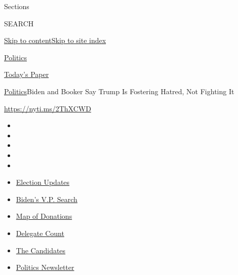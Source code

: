 Sections

SEARCH

\protect\hyperlink{site-content}{Skip to
content}\protect\hyperlink{site-index}{Skip to site index}

\href{https://www.nytimes.com/section/politics}{Politics}

\href{https://myaccount.nytimes.com/auth/login?response_type=cookie\&client_id=vi}{}

\href{https://www.nytimes.com/section/todayspaper}{Today's Paper}

\href{/section/politics}{Politics}\textbar{}Biden and Booker Say Trump
Is Fostering Hatred, Not Fighting It

\url{https://nyti.ms/2ThXCWD}

\begin{itemize}
\item
\item
\item
\item
\item
\end{itemize}

\begin{itemize}
\item
  \href{https://www.nytimes.com/2020/07/31/us/elections/biden-vs-trump.html?action=click\&pgtype=Article\&state=default\&region=TOP_BANNER\&context=storylines_menu}{Election
  Updates}
\item
  \href{https://www.nytimes.com/article/biden-vice-president-2020.html?action=click\&pgtype=Article\&state=default\&region=TOP_BANNER\&context=storylines_menu}{Biden's
  V.P. Search}
\item
  \href{https://www.nytimes.com/interactive/2020/07/24/us/politics/trump-biden-campaign-donors.html?action=click\&pgtype=Article\&state=default\&region=TOP_BANNER\&context=storylines_menu}{Map
  of Donations}
\item
  \href{https://www.nytimes.com/interactive/2020/us/elections/delegate-count-primary-results.html?action=click\&pgtype=Article\&state=default\&region=TOP_BANNER\&context=storylines_menu}{Delegate
  Count}
\item
  \href{https://www.nytimes.com/interactive/2019/us/politics/2020-presidential-candidates.html?action=click\&pgtype=Article\&state=default\&region=TOP_BANNER\&context=storylines_menu}{The
  Candidates}
\item
  \href{https://www.nytimes.com/newsletters/politics?action=click\&pgtype=Article\&state=default\&region=TOP_BANNER\&context=storylines_menu}{Politics
  Newsletter}
\end{itemize}

